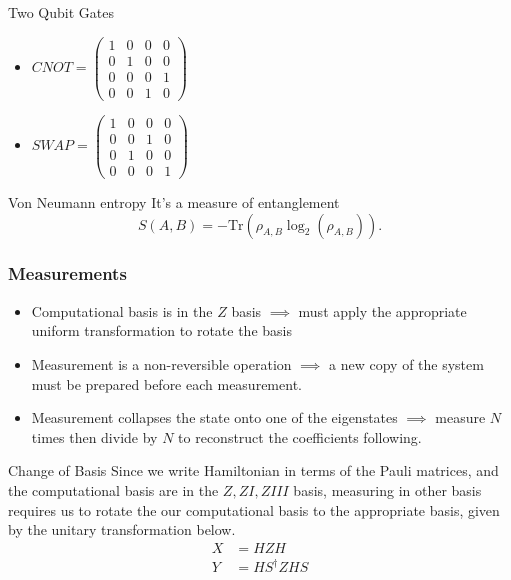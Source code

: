 \documentclass{beamer}
\begin{document}
\begin{frame}[t]
\begin{block}{Two Qubit Gates}
	\begin{itemize}
		\item $ CNOT = \begin{pmatrix} 1 & 0 & 0 & 0 \\ 0 & 1 & 0 & 0 \\ 0 & 0 & 0 & 1 \\ 0 & 0 & 1 & 0 \end{pmatrix} $ 
		\item $ SWAP = \begin{pmatrix} 1 & 0 & 0 & 0 \\ 0 & 0 & 1 & 0 \\ 0 & 1 & 0 & 0 \\ 0 & 0 & 0 & 1 \end{pmatrix} $
	\end{itemize}
		
\end{block}

\begin{block}{Von Neumann entropy}
	It's a measure of entanglement
	\[ S(A,B)=-\mathrm{Tr}\left(\rho_{A,B}\log_2 (\rho_{A,B})\right). \] 
\end{block}
	
\end{frame}

\begin{frame}[t]
	\frametitle{Measurements}
	\begin{itemize}
		\item Computational basis is in the $ Z $ basis $ \implies $ must apply the appropriate uniform transformation to rotate the basis
		\item Measurement is a non-reversible operation $ \implies $ a new copy of the system must be prepared before each measurement.
		\item Measurement collapses the state onto one of the eigenstates $ \implies $ measure $ N $ times then divide by $N$  to reconstruct the coefficients following.
	\end{itemize}
	\begin{block}{Change of Basis}
		Since we write Hamiltonian in terms of the Pauli matrices, and the computational basis are in the $ Z, ZI, ZIII $  basis, measuring in other basis requires us to rotate the our computational basis to the appropriate basis, given by the unitary transformation below.
		\begin{align*}
			X &= HZH \\
			Y &= HS^{\dagger}ZHS
		\end{align*}
	\end{block}
\end{frame}
\end{document}
